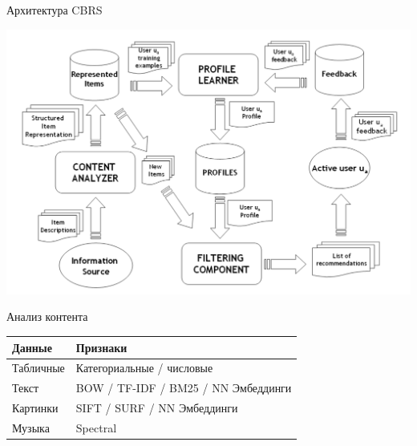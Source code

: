 \documentclass[11pt,aspectratio=169]{beamer}
\begin{document}
\begin{frame}{Архитектура CBRS \cite{RSHB}}

\begin{center}
\includegraphics[scale=0.3]{images/cbf.png}
\end{center}

\end{frame}

\begin{frame}{Анализ контента}

\begin{center}
\begin{tabular}{ l | p{20em} }
{\bf Данные} & {\bf Признаки} \\
\hline
Табличные \pause &  Категориальные / числовые \\
Текст \pause & BOW / TF-IDF / BM25 / NN Эмбеддинги \\
Картинки \pause & SIFT / SURF / NN Эмбеддинги \\
Музыка \pause & Spectral 
\end{tabular}
\end{center}

\end{frame}
\end{document}
